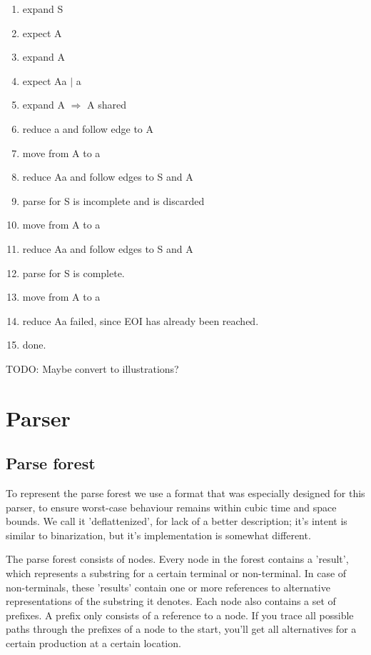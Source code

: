 \documentclass[a4paper,10pt]{article}
\begin{document}
\begin{enumerate}
 \setlength{\itemsep}{0pt}
 \setlength{\parskip}{0pt}
 \setlength{\parsep}{0pt}
 
 \item expand S
 \item expect A
 \item expand A
 \item expect Aa $|$ a
 \item expand A $\Rightarrow$ A shared
 \item reduce a and follow edge to A
 \item move from A to a
 \item reduce Aa and follow edges to S and A
 \item parse for S is incomplete and is discarded
 \item move from A to a
 \item reduce Aa and follow edges to S and A
 \item parse for S is complete.
 \item move from A to a
 \item reduce Aa failed, since EOI has already been reached.
 \item done.
\end{enumerate}

TODO: Maybe convert to illustrations?

\section{Parser}

\subsection{Parse forest}

To represent the parse forest we use a format that was especially designed for this parser, to ensure worst-case behaviour remains within cubic time and space bounds. We call it 'deflattenized', for lack of a better description; it's intent is similar to binarization, but it's implementation is somewhat different.

The parse forest consists of nodes. Every node in the forest contains a 'result', which represents a substring for a certain terminal or non-terminal. In case of non-terminals, these 'results' contain one or more references to alternative representations of the substring it denotes. Each node also contains a set of prefixes. A prefix only consists of a reference to a node. If you trace all possible paths through the prefixes of a node to the start, you'll get all alternatives for a certain production at a certain location.
\end{document}

